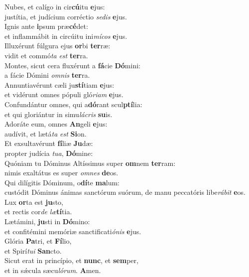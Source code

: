 \evenverse Nubes, et calígo in cir\textbf{cú}itu \textbf{e}jus:~\*\\
\evenverse justítia, et judícium corréctio \textit{se}\textit{dis} \textbf{e}jus.\\
\oddverse Ignis ante \textbf{i}psum præ\textbf{cé}det:~\*\\
\oddverse et inflammábit in circúitu ini\textit{mí}\textit{cos} \textbf{e}jus.\\
\evenverse Illuxérunt fúlgura ejus \textbf{or}bi \textbf{ter}ræ:~\*\\
\evenverse vidit et commó\textit{ta} \textit{est} \textbf{ter}ra.\\
\oddverse Montes, sicut cera fluxérunt a \textbf{fá}cie \textbf{Dó}mini:~\*\\
\oddverse a fácie Dómini \textit{om}\textit{nis} \textbf{ter}ra.\\
\evenverse Annuntiavérunt cæli ju\textbf{stí}tiam \textbf{e}jus:~\*\\
\evenverse et vidérunt omnes pópuli gló\textit{ri}\textit{am} \textbf{e}jus.\\
\oddverse Confundántur omnes, qui a\textbf{dó}rant scul\textbf{ptí}lia:~\*\\
\oddverse et qui gloriántur in simu\textit{lá}\textit{cris} \textbf{su}is.\\
\evenverse Adoráte eum, omnes \textbf{An}geli \textbf{e}jus:~\*\\
\evenverse audívit, et lætá\textit{ta} \textit{est} \textbf{Si}on.\\
\oddverse Et exsultavérunt \textbf{fí}liæ \textbf{Ju}dæ:~\*\\
\oddverse propter judícia \textit{tu}\textit{a}, \textbf{Dó}mine:\\
\evenverse Quóniam tu Dóminus Altíssimus super \textbf{om}nem \textbf{ter}ram:~\*\\
\evenverse nimis exaltátus es super \textit{om}\textit{nes} \textbf{de}os.\\
\oddverse Qui dilígitis Dóminum, o\textbf{dí}te \textbf{ma}lum:~\*\\
\oddverse custódit Dóminus ánimas sanctórum suórum, de manu peccatóris libe\textit{rá}\textit{bit} \textbf{e}os.\\
\evenverse Lux \textbf{or}ta est \textbf{ju}sto,~\*\\
\evenverse et rectis cor\textit{de} \textit{læ}\textbf{tí}tia.\\
\oddverse Lætámini, \textbf{ju}sti in \textbf{Dó}mino:~\*\\
\oddverse et confitémini memóriæ sanctificati\textit{ó}\textit{nis} \textbf{e}jus.\\
\evenverse Glória \textbf{Pa}tri, et \textbf{Fí}lio,~\*\\
\evenverse et Spirí\textit{tu}\textit{i} \textbf{San}cto.\\
\oddverse Sicut erat in princípio, et \textbf{nunc}, et \textbf{sem}per,~\*\\
\oddverse et in sǽcula sæcu\textit{ló}\textit{rum}. \textbf{A}men.\\
